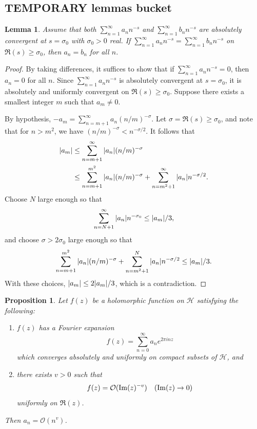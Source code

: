 \documentclass[10pt,leqno,twoside]{article}
\theoremstyle{plain}
\newtheorem{lemma}[lem]{Lemma}
\newtheorem{proposition}[lem]{Proposition}
\theoremstyle{definition}
\numberwithin{equation}{section}
\numberwithin{lem}{section}
\begin{document}
\subsection{TEMPORARY lemmas bucket}
\begin{lemma}\label{lem: miyake lem 3.2.1}
    Assume that both $\sum_{n=1}^\infty a_nn^{-s}$ and $\sum_{n=1}^\infty b_nn^{-s}$ are absolutely convergent at $s = \sigma_0$ with $\sigma_0>0$ real. If $\sum_{n=1}^\infty a_nn^{-s} = \sum_{n=1}^\infty b_nn^{-s}$ on $\Re(s)\geq \sigma_0$, then $a_n = b_n$ for all $n$.
\end{lemma}
\begin{proof}
    By taking differences, it suffices to show that if $\sum_{n=1}^\infty a_nn^{-s} = 0$, then $a_n = 0$ for all $n$. Since $\sum_{n=1}^\infty a_nn^{-s}$ is absolutely convergent at $s = \sigma_0$, it is absolutely and uniformly convergent on $\Re(s)\geq \sigma_0$. Suppose there exists a smallest integer $m$ such that $a_m \neq 0$.
    
    By hypothesis, $-a_m = \sum_{n=m+1}^\infty a_n (n/m)^{-\sigma}$. Let $\sigma = \Re(s)\geq \sigma_0$, and note that for $n>m^2$, we have $(n/m)^{-\sigma}<n^{-\sigma/2}$. It follows that
    \begin{align*}
        \abs{a_m} &\leq \sum_{n=m+1}^\infty \abs{a_n} (n/m)^{-\sigma}\\
        &\leq \sum_{n=m+1}^{m^2} \abs{a_n} (n/m)^{-\sigma} + \sum_{n=m^2+1}^\infty \abs{a_n} n^{-\sigma/2}.
    \end{align*}
    Choose $N$ large enough so that
    \[\sum_{n=N+1}^\infty \abs{a_n}n^{-\sigma_0}\leq \abs{a_m}/3,\]
    and choose $\sigma>2\sigma_0$ large enough so that 
    \[\sum_{n=m+1}^{m^2} \abs{a_n} (n/m)^{-\sigma} + \sum_{n=m^2+1}^N \abs{a_n}n^{-\sigma/2}\leq \abs{a_m}/3.\] With these choices, $\abs{a_m}\leq 2\abs{a_m}/3$, which is a contradiction.
\end{proof}
\begin{proposition}\label{prop: miyake prop pre-lemma 4.3.3}
    Let $f(z)$ be a holomorphic function on $\mathcal H$ satisfying the following: 
    \begin{enumerate}[label = \textup{(\arabic*)}]
        \item $f(z)$ has a Fourier expansion \[f(z) = \sum_{n=0}^\infty a_ne^{2\pi i nz}\] which converges absolutely and uniformly on compact subsets of $\mathcal H$, and
        \item there exists $v>0$ such that \[f(z) = \mathcal O(\Im(z)^{-v}) \quad \textup{($\Im(z)\to 0$)}\] uniformly on $\Re(z)$. 
    \end{enumerate}
    Then $a_n = \mathcal O(n^v)$.
\end{proposition}
\end{document}
